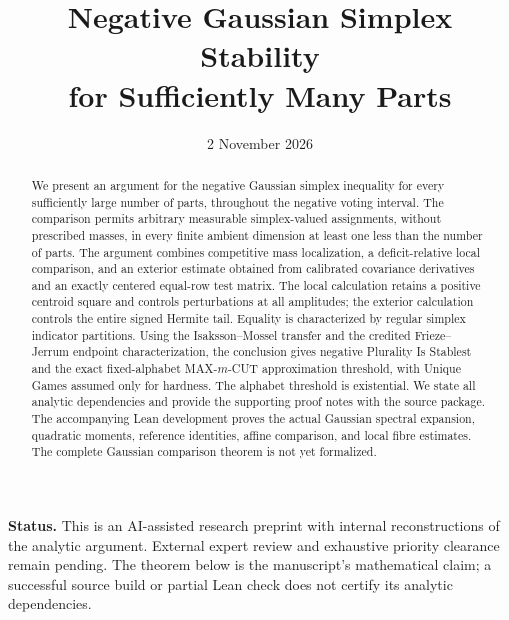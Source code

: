 \documentclass[11pt]{article}
\title{\bfseries Negative Gaussian Simplex Stability\\for Sufficiently Many Parts}
\date{2 November 2026}
\numberwithin{equation}{section}
\theoremstyle{remark}
\begin{document}
\maketitle
\begin{abstract}
We present an argument for the negative Gaussian simplex inequality for
every sufficiently large number of parts, throughout the negative voting
interval. The comparison permits arbitrary measurable simplex-valued
assignments, without prescribed masses, in every finite ambient dimension
at least one less than the number of parts. The argument combines
competitive mass localization, a deficit-relative local comparison, and
an exterior estimate obtained from calibrated covariance derivatives and
an exactly centered equal-row test matrix. The local calculation retains
a positive centroid square and controls perturbations at all amplitudes;
the exterior calculation controls the entire signed Hermite tail.
Equality is characterized by regular simplex indicator partitions.
Using the Isaksson--Mossel transfer and the credited Frieze--Jerrum
endpoint characterization, the conclusion gives negative Plurality Is
Stablest and the exact fixed-alphabet MAX-$m$-CUT approximation threshold,
with Unique Games assumed only for hardness. The alphabet threshold is
existential. We state all analytic dependencies and provide the supporting
proof notes with the source package. The accompanying Lean development
proves the actual Gaussian spectral expansion, quadratic moments, reference
identities, affine comparison, and local fibre estimates. The complete
Gaussian comparison theorem is not yet formalized.
\end{abstract}
\noindent\textbf{Status.} This is an AI-assisted research preprint with
internal reconstructions of the analytic argument. External expert review
and exhaustive priority clearance remain pending. The theorem below is
the manuscript's mathematical claim; a successful source build or partial
Lean check does not certify its analytic dependencies.

\clearpage
\setcounter{tocdepth}{1}
\tableofcontents








\appendix


\end{document}
